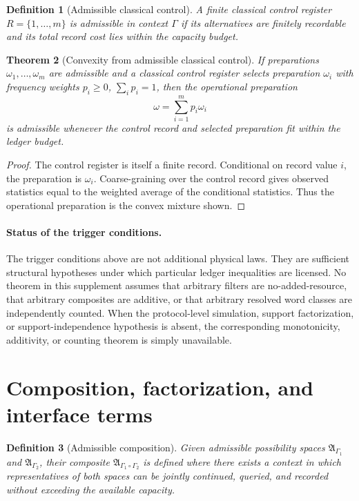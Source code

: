 \documentclass[11pt]{article}
\newtheorem{theorem}{Theorem}[section]
\newtheorem{definition}[theorem]{Definition}
\newcommand{\A}{\mathfrak A}
\begin{document}
\begin{definition}[Admissible classical control]
A finite classical control register $R=\{1,\ldots,m\}$ is admissible in context $\Gamma$ if its alternatives are finitely recordable and its total record cost lies within the capacity budget.
\end{definition}

\begin{theorem}[Convexity from admissible classical control]
If preparations $\omega_1,\ldots,\omega_m$ are admissible and a classical control register selects preparation $\omega_i$ with frequency weights $p_i\ge0$, $\sum_i p_i=1$, then the operational preparation
\[
 \omega=\sum_{i=1}^m p_i\omega_i
\]
is admissible whenever the control record and selected preparation fit within the ledger budget.
\end{theorem}
\begin{proof}
The control register is itself a finite record.  Conditional on record value $i$, the preparation is $\omega_i$.  Coarse-graining over the control record gives observed statistics equal to the weighted average of the conditional statistics.  Thus the operational preparation is the convex mixture shown.
\end{proof}

\paragraph{Status of the trigger conditions.}
The trigger conditions above are not additional physical laws.  They are
sufficient structural hypotheses under which particular ledger
inequalities are licensed.  No theorem in this supplement assumes that
arbitrary filters are no-added-resource, that arbitrary composites are
additive, or that arbitrary resolved word classes are independently
counted.  When the protocol-level simulation, support factorization, or
support-independence hypothesis is absent, the corresponding
monotonicity, additivity, or counting theorem is simply unavailable.

\section{Composition, factorization, and interface terms}\label{sec:composition-factorization}

\begin{definition}[Admissible composition]
Given admissible possibility spaces $\A_{\Gamma_1}$ and $\A_{\Gamma_2}$, their composite $\A_{\Gamma_1\circ\Gamma_2}$ is defined where there exists a context in which representatives of both spaces can be jointly continued, queried, and recorded without exceeding the available capacity.
\end{definition}
\end{document}
